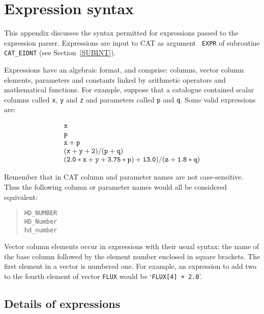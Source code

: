 \begin{small}
\end{small}

\newpage
\section{\label{EXPR}Expression syntax}

This appendix discusses the syntax permitted for expressions passed
to the expression parser. Expressions are input to CAT as argument {\tt 
EXPR} of subroutine {\tt CAT\_EIDNT} (see Section~\ref{SUBINT}).

Expressions have an algebraic format, and comprise: columns, vector
column elements, parameters and constants linked by arithmetic 
operators and mathematical functions. For example, suppose that a 
catalogue contained scalar columns called {\tt x}, {\tt y} and {\tt z} 
and parameters called {\tt p} and {\tt q}.  Some valid expressions are:

\begin{equation}
\begin{array}{l}
{\tt x}  \\
{\tt p}  \\
{\tt x + p}  \\
{\tt (x + y + 2) / (p + q)}  \\
{\tt (2.0*x + y + 3.75*p) + 13.0) / (z + 1.8*q)}
\end{array}
\end{equation}

Remember that in CAT column and parameter names are not case-sensitive.
Thus the following column or parameter names would all be considered
equivalent:

\begin{verse}
{\tt HD\_NUMBER} \\
{\tt HD\_Number} \\
{\tt hd\_number}
\end{verse}

Vector column elements occur in expressions with their usual syntax: 
the name of the base column followed by the element number enclosed 
in square brackets. The first element in a vector is numbered one. For 
example, an expression to add two to the fourth element of vector 
{\tt FLUX} would be `{\tt FLUX[4] + 2.0}'.


\subsection{Details of expressions}

